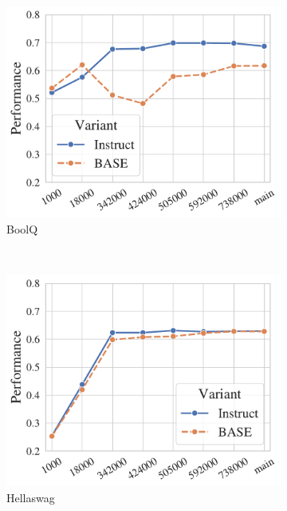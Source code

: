\begin{figure}[t!]
\begin{subfigure}[b]{0.3\textwidth}
    \includegraphics[width=\the\columnwidth]{figures/fig_files/it_ckpts/it_evalboolq.pdf}
        \caption{BoolQ}
    \end{subfigure}%
    \\
    \begin{subfigure}[b]{0.3\textwidth}
    \includegraphics[width=\the\columnwidth]{figures/fig_files/it_ckpts/it_evalhellaswag.pdf}
        \caption{Hellaswag}
    \end{subfigure}%
    ~ 
    \begin{subfigure}[b]{0.3\textwidth}

\end{subfigure}
\end{figure}
